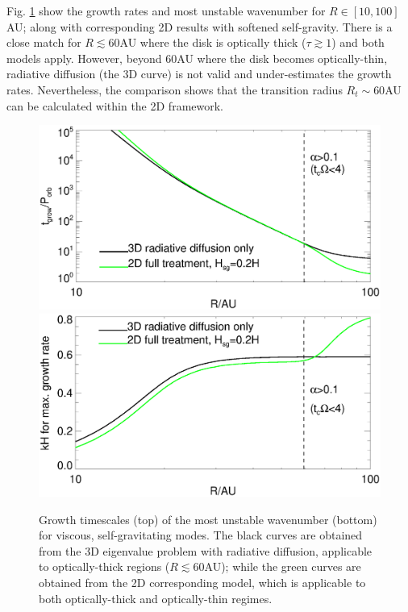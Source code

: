 Fig. \ref{rafikov_growth3d} show the growth rates and most unstable
wavenumber for $R\in[10,100]$AU; along with corresponding 2D 
results with softened self-gravity. There is a close match for
$R\lesssim60$AU where the disk is optically thick ($\tau\gtrsim
1$) and both models apply. However, beyond $60$AU where the disk
becomes optically-thin, radiative diffusion (the 3D curve) is not
valid and under-estimates the growth rates. Nevertheless, the
comparison shows that the transition radius $R_t\sim60$AU can be
calculated within the 2D framework. 

\begin{figure}
  \includegraphics[width=\linewidth,clip=true,trim=0cm 1.5cm 0cm
    0.0cm]{figures/ppd_3d_rates}\\
  \includegraphics[width=\linewidth,clip=true,trim=0cm 0cm 0cm
    0.8cm]{figures/ppd_3d_maxk}
  \caption{Growth timescales (top) of the most unstable
    wavenumber (bottom) for viscous, 
    self-gravitating modes. The black curves are obtained
    from the 3D eigenvalue problem with radiative diffusion,
    applicable to optically-thick regions ($R\lesssim 60$AU); 
    while the green curves are obtained from the 2D corresponding
    model, which is applicable to both optically-thick and
    optically-thin regimes.  
    \label{rafikov_growth3d}}
\end{figure}



